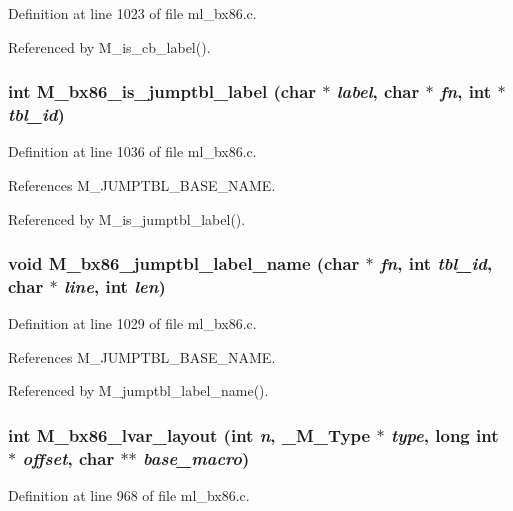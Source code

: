 Definition at line 1023 of file ml\_\-bx86.c.

Referenced by M\_\-is\_\-cb\_\-label().
\subsubsection{\setlength{\rightskip}{0pt plus 5cm}int M\_\-bx86\_\-is\_\-jumptbl\_\-label (char $\ast$ {\em label}, char $\ast$ {\em fn}, int $\ast$ {\em tbl\_\-id})}\label{ml__bx86_8c_d889ce4fb3f4591f9eaff89ca14dd2d6}




Definition at line 1036 of file ml\_\-bx86.c.

References M\_\-JUMPTBL\_\-BASE\_\-NAME.

Referenced by M\_\-is\_\-jumptbl\_\-label().
\subsubsection{\setlength{\rightskip}{0pt plus 5cm}void M\_\-bx86\_\-jumptbl\_\-label\_\-name (char $\ast$ {\em fn}, int {\em tbl\_\-id}, char $\ast$ {\em line}, int {\em len})}\label{ml__bx86_8c_6e48d8df24c32bf54a6784df59c8a72b}




Definition at line 1029 of file ml\_\-bx86.c.

References M\_\-JUMPTBL\_\-BASE\_\-NAME.

Referenced by M\_\-jumptbl\_\-label\_\-name().
\subsubsection{\setlength{\rightskip}{0pt plus 5cm}int M\_\-bx86\_\-lvar\_\-layout (int {\em n}, \bf{\_\-M\_\-Type} $\ast$ {\em type}, long int $\ast$ {\em offset}, char $\ast$$\ast$ {\em base\_\-macro})}\label{ml__bx86_8c_0842e184f1f9d2921d28ab34daa640fd}




Definition at line 968 of file ml\_\-bx86.c.

